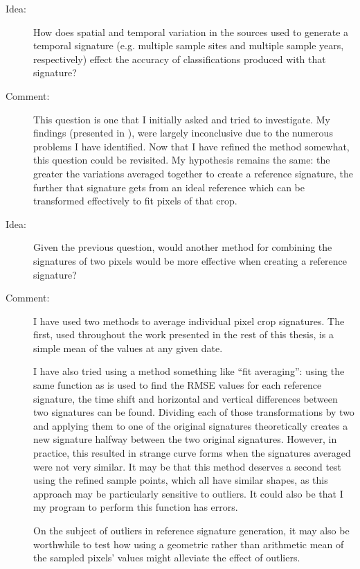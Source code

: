 \begin{description}
\item[Idea:] How does spatial and temporal variation in the sources used to generate a temporal signature (e.g. multiple sample sites and multiple sample years, respectively) effect the accuracy of classifications produced with that signature?

\item[Comment:] This question is one that I initially asked and tried to investigate. My findings (presented in 
), were largely inconclusive due to the numerous problems I have identified. Now that I have refined the method somewhat, this question could be revisited. My hypothesis remains the same: the greater the variations averaged together to create a reference signature, the further that signature gets from an ideal reference which can be transformed effectively to fit pixels of that crop.

\item[Idea:] Given the previous question, would another method for combining the signatures of two pixels would be more effective when creating a reference signature?

\item[Comment:] I have used two methods to average individual pixel crop signatures. The first, used throughout the work presented in the rest of this thesis, is a simple mean of the values at any given date.

I have also tried using a method something like ``fit averaging'': using the same function as is used to find the RMSE values for each reference signature, the time shift and horizontal and vertical differences between two signatures can be found. Dividing each of those transformations by two and applying them to one of the original signatures theoretically creates a new signature halfway between the two original signatures. However, in practice, this resulted in strange curve forms when the signatures averaged were not very similar. It may be that this method deserves a second test using the refined sample points, which all have similar shapes, as this approach may be particularly sensitive to outliers. It could also be that I my program to perform this function has errors.

On the subject of outliers in reference signature generation, it may also be worthwhile to test how using a geometric rather than arithmetic mean of the sampled pixels’ values might alleviate the effect of outliers.
\end{description}

